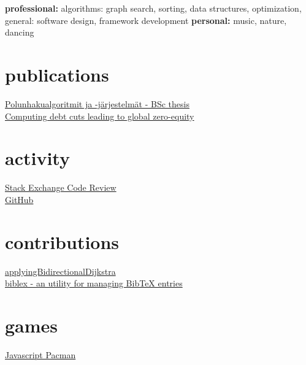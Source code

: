 \documentclass[]{friggeri-cv} %
\begin{document}
\textbf{professional:} algorithms: graph search, sorting, data structures, optimization, general: software design, framework development \textbf{personal:} music, nature, dancing


\section{publications}

\begin{entrylist}
\href{https://github.com/coderodde/bsc-thesis/blob/master/tutkielma.pdf?raw=true}{Polunhakualgoritmit ja -järjestelmät - BSc thesis} \\
\href{https://github.com/coderodde/lce-doc/blob/master/paper.pdf?raw=true}{Computing debt cuts leading to global zero-equity}
\end{entrylist}


\section{activity}

\begin{entrylist}
\href{http://codereview.stackexchange.com/users/58360/coderodde}{Stack Exchange Code Review} \\
\href{https://github.com/coderodde?tab=repositories}{GitHub}
\end{entrylist}

\section{contributions}

\begin{entrylist}
\href{http://svn.apache.org/viewvc/commons/sandbox/graph/trunk/src/main/java/org/apache/commons/graph/shortestpath/DefaultShortestPathAlgorithmSelector.java?view=markup}{applyingBidirectionalDijkstra} \\
\href{https://github.com/biblex2013/biblex}{biblex - an utility for managing BibTeX entries}
\end{entrylist}

\section{games}

\href{http://www.cs.helsinki.fi/u/rodionef/pacman/}{Javascript Pacman}
\end{document}

